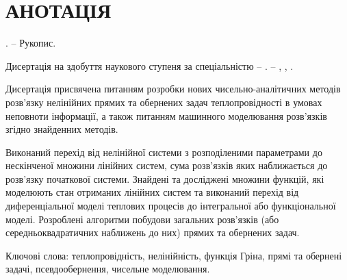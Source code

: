 \chapter*{АНОТАЦІЯ}

\disserShortAuthor \space \disserTitle. – Рукопис.
\par Дисертація на здобуття наукового ступеня \disserDegree за спеціальністю \disserSpecialtyNumber – \disserSpecialtyTitle.
– \disserOrganization, \disserCity, \disserYear.
\par Дисертація присвячена питанням розробки нових чисельно-аналітичних методів розв'язку нелінійних прямих та обернених
задач теплопровідності в умовах неповноти інформації, а також питанням машинного моделювання
розв'язків згідно знайденних методів.
\par Виконаний перехід від нелінійної системи з розподіленими параметрами до нескінченої множини лінійних систем,
сума розв'язків яких наближається до розв'язку початкової системи.
Знайдені та досліджені множини функцій, які моделюють стан отриманих лінійних систем та виконаний перехід від
диференціальної моделі теплових процесів до інтегральної або функціональної моделі.
Розроблені алгоритми побудови загальних розв'язків (або середньоквадратичних наближень до них) прямих та
обернених задач.
\par Ключові слова: теплопровідність, нелінійність, функція Гріна, прямі та обернені задачі, псевдообернення, чисельне моделювання.


\vspace{0pt plus1fill}
